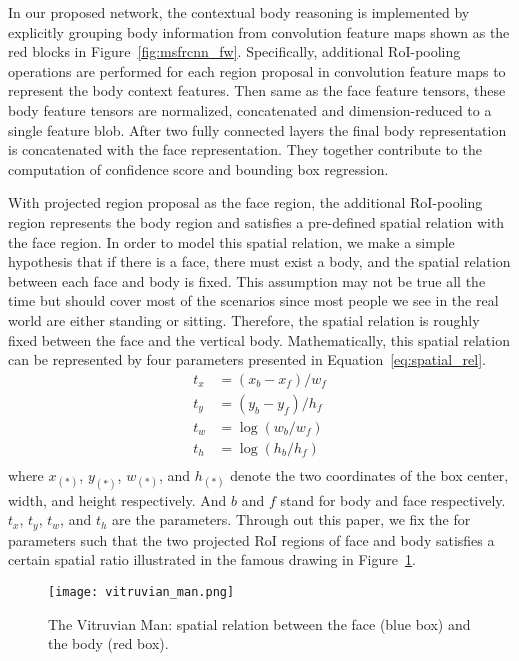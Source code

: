 \documentclass[10pt,journal,cspaper,compsoc]{IEEEtran}
\begin{document}
In our proposed network, the contextual body reasoning is implemented by explicitly grouping body information from convolution feature maps shown as the red blocks in Figure~\ref{fig:msfrcnn_fw}. Specifically, additional RoI-pooling operations are performed for each region proposal in convolution feature maps to represent the body context features. Then same as the face feature tensors, these body feature tensors are normalized, concatenated and dimension-reduced to a single feature blob. After two fully connected layers the final body representation is concatenated with the face representation. They together contribute to the computation of confidence score and bounding box regression.

With projected region proposal as the face region, the additional RoI-pooling region represents the body region and satisfies a pre-defined spatial relation with the face region. In order to model this spatial relation, we make a simple hypothesis that if there is a face, there must exist a body, and the spatial relation between each face and body is fixed. This assumption may not be true all the time but should cover most of the scenarios since most people we see in the real world are either standing or sitting. Therefore, the spatial relation is roughly fixed between the face and the vertical body. 
Mathematically, this spatial relation can be represented by four parameters presented in Equation~\ref{eq:spatial_rel}. 
\begin{equation}
\label{eq:spatial_rel}
    \begin{split}
        t_x &= (x_b - x_f)/w_f \\
        t_y &= (y_b - y_f)/h_f \\
        t_w &= \log(w_b/w_f) \\
        t_h &= \log(h_b/h_f) \\
    \end{split}
\end{equation}
where $x_{(*)}$, $y_{(*)}$, $w_{(*)}$, and $h_{(*)}$  denote the two coordinates of the box center, width, and height respectively. And $b$ and $f$ stand for body and face respectively. $t_x$, $t_y$, $t_w$, and $t_h$ are the parameters. Through out this paper, we fix the for parameters such that the two projected RoI regions of face and body satisfies a certain spatial ratio illustrated in the famous drawing in Figure~\ref{fig:man}.
\begin{figure}
    \centering
    \texttt{[image: vitruvian\_man.png]}
    \caption{The Vitruvian Man: spatial relation between the face (blue box) and the body (red box).}
    \label{fig:man}
\end{figure}
\end{document}
